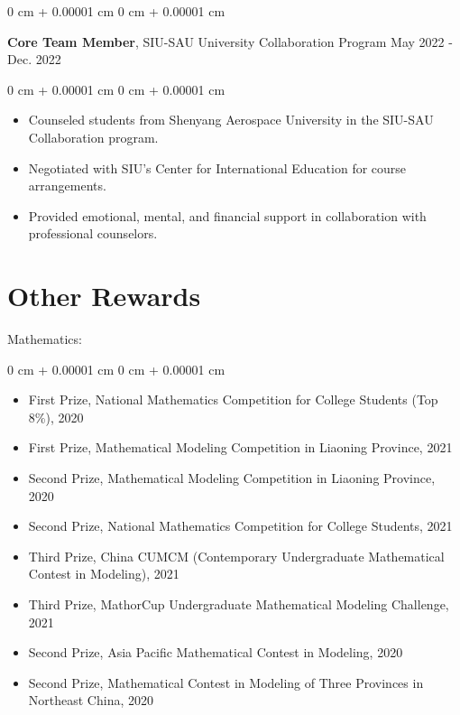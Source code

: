 \documentclass[10pt, letterpaper]{article}
\newenvironment{highlights}{
    \begin{itemize}[
        topsep=0.10 cm,
        parsep=0.10 cm,
        partopsep=0pt,
        itemsep=0pt,
        leftmargin=0 cm + 10pt
    ]
}{
    \end{itemize}
} %
\newenvironment{onecolentry}{
    \begin{adjustwidth}{
        0 cm + 0.00001 cm
    }{
        0 cm + 0.00001 cm
    }
}{
    \end{adjustwidth}
} %
\newenvironment{twocolentry}[2][]{
    \onecolentry
    \def\secondColumn{#2}
    \setcolumnwidth{\fill, 4.5 cm}
    \begin{paracol}{2}
}{ 
    \switchcolumn \raggedleft \secondColumn
    \end{paracol}
    \endonecolentry
} %
\begin{document}
    \vspace{0.2 cm}

    \begin{twocolentry}{
        May 2022 - Dec. 2022
    }
        \textbf{Core Team Member}, SIU-SAU University Collaboration Program\end{twocolentry}

    \vspace{0.10 cm}
    \begin{onecolentry}
        \begin{highlights}
            \item Counseled students from Shenyang Aerospace University in the SIU-SAU Collaboration program.
            \item Negotiated with SIU's Center for International Education for course arrangements.
            \item Provided emotional, mental, and financial support in collaboration with professional counselors.
        \end{highlights}
    \end{onecolentry}


    \section{Other Rewards}

Mathematics:
    \vspace{0.10 cm}
    \begin{onecolentry}
        \begin{highlights}
            \item First Prize, National Mathematics Competition for College Students (Top 8\%), 2020
            \item First Prize, Mathematical Modeling Competition in Liaoning Province, 2021
            \item Second Prize, Mathematical Modeling Competition in Liaoning Province, 2020
            \item Second Prize, National Mathematics Competition for College Students, 2021
            \item Third Prize, China CUMCM (Contemporary Undergraduate Mathematical Contest in Modeling), 2021
            \item Third Prize, MathorCup Undergraduate Mathematical Modeling Challenge, 2021
            \item Second Prize, Asia Pacific Mathematical Contest in Modeling, 2020
            \item Second Prize, Mathematical Contest in Modeling of Three Provinces in Northeast China, 2020
        \end{highlights}
    \end{onecolentry}
\end{document}
